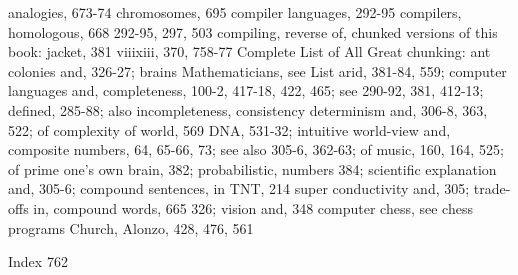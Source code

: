 analogies,         673-74     chromosomes,    695 compiler languages, 292-95 compilers,
homologous, 668                               292-95, 297, 503 compiling, reverse of,
chunked versions of this book: jacket,        381
        viiixiii, 370, 758-77                 Complete       List      of     All    Great
chunking: ant colonies and, 326-27; brains    Mathematicians, see List
arid, 381-84, 559; computer languages and,    completeness, 100-2, 417-18, 422, 465; see
290-92, 381, 412-13; defined, 285-88;         also incompleteness, consistency
determinism and, 306-8, 363, 522; of          complexity of world, 569
DNA, 531-32; intuitive world-view and,        composite numbers, 64, 65-66, 73; see also
305-6, 362-63; of music, 160, 164, 525; of    prime
one's own brain, 382; probabilistic,          numbers
384; scientific explanation and, 305-6;       compound sentences, in TNT, 214
super conductivity and, 305; trade-offs in,   compound words, 665
326; vision and, 348                          computer chess, see chess programs
Church, Alonzo, 428, 476, 561



Index                                                                                 762

